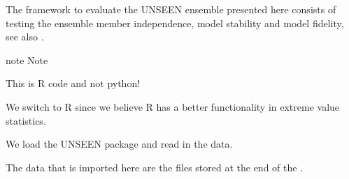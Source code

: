 \documentclass[letterpaper,10pt,english]{sphinxmanual}
\begin{document}
The framework to evaluate the UNSEEN ensemble presented here consists of testing the ensemble member independence, model stability and model fidelity, see also .

\begin{sphinxadmonition}{note}{}\unskip
Note

This is R code and not python!

We switch to R since we believe R has a better functionality in extreme value statistics.
\end{sphinxadmonition}

We load the UNSEEN package and read in the data.

{
\begin{sphinxVerbatim}[commandchars=\\\{\}]
\llap{\color{nbsphinxin}[2]:\,\hspace{\fboxrule}\hspace{\fboxsep}}
\end{sphinxVerbatim}
}

The data that is imported here are the files stored at the end of the {\hyperref[\detokenize{Notebooks/2.Preprocess/2.Preprocess::doc}]{}}.

{
\begin{sphinxVerbatim}[commandchars=\\\{\}]
\llap{\color{nbsphinxin}[125]:\,\hspace{\fboxrule}\hspace{\fboxsep}}   
   
\end{sphinxVerbatim}
}
\end{document}
